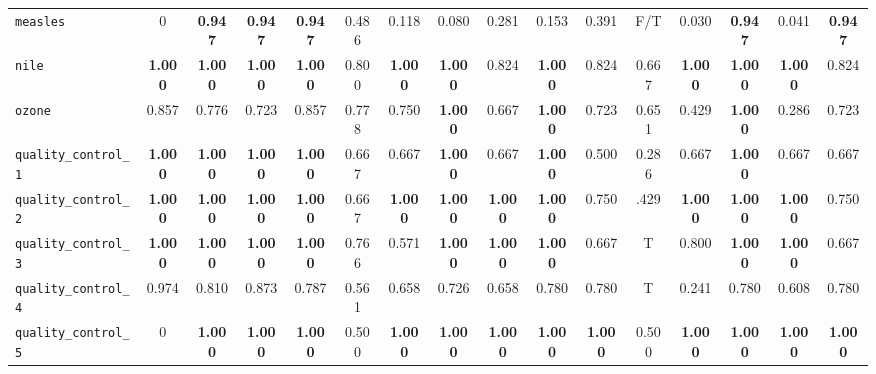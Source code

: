 \begin{table*}[h!]
\begin{adjustbox}{width=\textwidth}
\begin{tabular}{l|c|cccccccccccccc}
    \cellcolor{gray!100}\verb+measles+ & \cellcolor{gray!100}0 & \cellcolor{gray!100}\textbf{0.947} & \cellcolor{gray!100}\textbf{0.947} & \cellcolor{gray!100}\textbf{0.947} & \cellcolor{gray!100}0.486 & \cellcolor{gray!100}0.118 & \cellcolor{gray!100}0.080 & \cellcolor{gray!100}0.281 & \cellcolor{gray!100}0.153 & \cellcolor{gray!100}0.391 & \cellcolor{gray!100}F/T & \cellcolor{gray!100}0.030 & \cellcolor{gray!100}\textbf{0.947} & \cellcolor{gray!100}0.041 & \cellcolor{gray!100}\textbf{0.947}\\
    
    \verb+nile+ & \textbf{1.000} & \textbf{1.000} & \textbf{1.000} & \textbf{1.000} & 0.800 & \textbf{1.000} & \textbf{1.000} & 0.824 & \textbf{1.000} & 0.824 & 0.667 & \textbf{1.000} & \textbf{1.000} & \textbf{1.000} & 0.824\\
    
    \verb+ozone+ & \cellcolor{SeaGreen!0}0.857 & 0.776 & 0.723 & 0.857 & 0.778 & 0.750 & \textbf{1.000} & 0.667 & \textbf{1.000} & 0.723 & 0.651 & 0.429 & \textbf{1.000} & 0.286 & 0.723\\
    
    \verb+quality_control_1+ & \textbf{1.000} & \textbf{1.000} & \textbf{1.000} & \textbf{1.000} & 0.667 & 0.667 & \textbf{1.000} & 0.667 & \textbf{1.000} & 0.500 & 0.286 & 0.667 & \textbf{1.000} & 0.667 & 0.667\\
    
    \verb+quality_control_2+ & \textbf{1.000} & \textbf{1.000} & \textbf{1.000} & \textbf{1.000} & 0.667 & \textbf{1.000} & \textbf{1.000} & \textbf{1.000} & \textbf{1.000} & 0.750 & .429 & \textbf{1.000} & \textbf{1.000} & \textbf{1.000} & 0.750\\
    
    \verb+quality_control_3+ & \textbf{1.000} & \textbf{1.000} & \textbf{1.000} & \textbf{1.000} & 0.766 & 0.571 & \textbf{1.000} & \textbf{1.000} & \textbf{1.000} & 0.667 & T & 0.800 & \textbf{1.000} & \textbf{1.000} & 0.667\\
    
    \verb+quality_control_4+ & \cellcolor{blue!10}0.974 & 0.810 & 0.873 & 0.787 & 0.561 & 0.658 & 0.726 & 0.658 & 0.780 & 0.780 & T & 0.241 & 0.780 & 0.608 & 0.780\\
    
    \cellcolor{gray!100}\verb+quality_control_5+ & \cellcolor{gray!100}0 & \cellcolor{gray!100}\textbf{1.000} & \cellcolor{gray!100}\textbf{1.000} & \cellcolor{gray!100}\textbf{1.000} & \cellcolor{gray!100}0.500 & \cellcolor{gray!100}\textbf{1.000} & \cellcolor{gray!100}\textbf{1.000} & \cellcolor{gray!100}\textbf{1.000} & \cellcolor{gray!100}\textbf{1.000} & \cellcolor{gray!100}\textbf{1.000} & \cellcolor{gray!100}0.500 & \cellcolor{gray!100}\textbf{1.000} & \cellcolor{gray!100}\textbf{1.000} & \cellcolor{gray!100}\textbf{1.000} & \cellcolor{gray!100}\textbf{1.000}\\
    

\end{tabular}
\end{adjustbox}
\end{table*}
